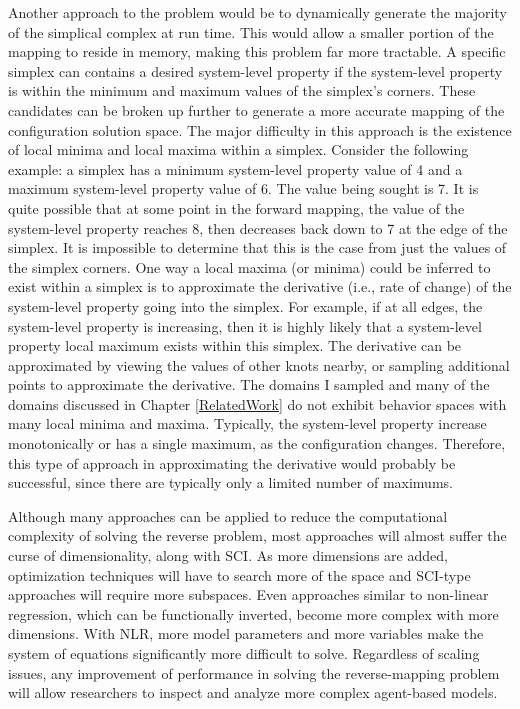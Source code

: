 Another approach to the problem would be to dynamically generate the majority of the simplical complex at run time.
This would allow a smaller portion of the mapping to reside in memory, making this problem far more tractable.
A specific simplex can contains a desired system-level property if the system-level property is within the minimum and maximum values of the simplex's corners.
These candidates can be broken up further to generate a more accurate mapping of the configuration solution space.
The major difficulty in this approach is the existence of local minima and local maxima within a simplex.
Consider the following example: a simplex has a minimum system-level property value of 4 and a maximum system-level property value of 6.
The value being sought is 7.
It is quite possible that at some point in the forward mapping, the value of the system-level property reaches 8, then decreases back down to 7 at the edge of the simplex.
It is impossible to determine that this is the case from just the values of the simplex corners.
One way a local maxima (or minima) could be inferred to exist within a simplex is to approximate the derivative (i.e., rate of change) of the system-level property going into the simplex.
For example, if at all edges, the system-level property is increasing, then it is highly likely that a system-level property local maximum exists within this simplex.
The derivative can be approximated by viewing the values of other knots nearby, or sampling additional points to approximate the derivative.
The domains I sampled and many of the domains discussed in Chapter \ref{RelatedWork} do not exhibit behavior spaces with many local minima and maxima.
Typically, the system-level property increase monotonically or has a single maximum, as the configuration changes.
Therefore, this type of approach in approximating the derivative would probably be successful, since there are typically  only a limited number of maximums.

Although many approaches can be applied to reduce the computational complexity of solving the reverse problem, most approaches will almost suffer the curse of dimensionality, along with SCI.
As more dimensions are added, optimization techniques will have to search more of the space and SCI-type approaches will require more subspaces.
Even approaches similar to non-linear regression, which can be functionally inverted, become more complex with more dimensions.
With NLR, more model parameters and more variables make the system of equations significantly more difficult to solve.
Regardless of scaling issues, any improvement of performance in solving the reverse-mapping problem will allow researchers to inspect and analyze more complex agent-based models.

